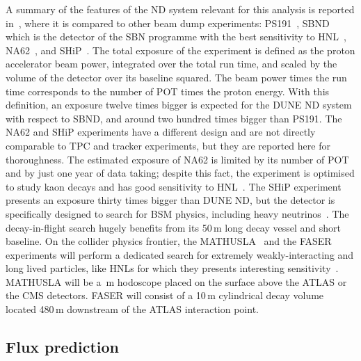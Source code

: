 A summary of the features of the ND system relevant for this analysis is reported in~, %
where it is compared to other beam dump experiments: %
PS191~\cite{Bernardi:1985ny,Bernardi:1987ek}, SBND which is the detector of the SBN programme with the best sensitivity to %
HNL~\cite{Ballett:2016opr}, NA62~\cite{NA62:2017rwk}, and SHiP~\cite{Anelli:2015pba}.
The total exposure of the experiment is defined as the proton accelerator beam power, integrated over the total run time, %
and scaled by the volume of the detector over its baseline squared.
The beam power times the run time corresponds to the number of POT times the proton energy. 
With this definition, an exposure twelve times bigger is expected for the DUNE ND system with respect to SBND, %
and around two hundred times bigger than PS191.
The NA62 and SHiP experiments have a different design and are not directly comparable to TPC and tracker experiments, %
but they are reported here for thoroughness.
The estimated exposure of NA62 is limited by its number of POT and by just one year of data taking; %
despite this fact, the experiment is optimised to study kaon decays and has good %
sensitivity to HNL~\cite{Drewes:2018irr}.
The SHiP experiment presents an exposure thirty times bigger than DUNE ND, but the detector is specifically %
designed to search for BSM physics, including heavy neutrinos~\cite{SHiP:2018xqw,Caputo:2016ojx}.
The decay-in-flight search hugely benefits from its 50\,m long decay vessel and short baseline.
On the collider physics frontier, the MATHUSLA~\cite{Curtin:2018mvb} and the FASER~\cite{Ariga:2018uku} experiments %
will perform a dedicated search for extremely weakly-interacting and long lived particles, %
like HNLs for which they presents interesting sensitivity~\cite{Curtin:2018mvb, Kling:2018wct}.
MATHUSLA will be a \,m hodoscope placed on the surface above the ATLAS or the CMS detectors.
FASER will consist of a 10\,m cylindrical decay volume located 480\,m downstream of the ATLAS interaction point. 

\subsection{Flux prediction}
\label{sec:tauneutrino}


